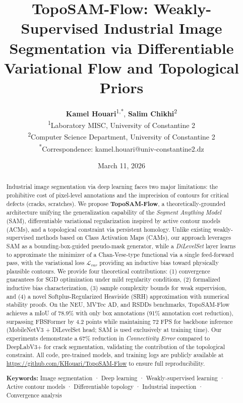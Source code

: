 \documentclass[12pt, a4paper]{article}
\title{\textbf{TopoSAM-Flow: Weakly-Supervised Industrial Image Segmentation via Differentiable Variational Flow and Topological Priors}}
\author{
    \textbf{Kamel Houari}\textsuperscript{1,*}, 
    \textbf{Salim Chikhi}\textsuperscript{2} \\
    \textsuperscript{1}Laboratory MISC, University of Constantine 2 \\
    \textsuperscript{2}Computer Science Department, University of Constantine 2 \\
    \textsuperscript{*}Correspondence: kamel.houari@univ-constantine2.dz
}
\date{March 11, 2026}
\begin{document}
\maketitle

\begin{abstract}
\noindent Industrial image segmentation via deep learning faces two major limitations: the prohibitive cost of pixel-level annotations and the imprecision of contours for critical defects (cracks, scratches). We propose \textbf{TopoSAM-Flow}, a theoretically-grounded architecture unifying the generalization capability of the \textit{Segment Anything Model} (SAM), differentiable variational regularization inspired by active contour models (ACMs), and a topological constraint via persistent homology. Unlike existing weakly-supervised methods based on Class Activation Maps (CAMs), our approach leverages SAM as a bounding-box-guided pseudo-mask generator, while a \textit{DiLevelSet} layer learns to approximate the minimizer of a Chan-Vese-type functional via a single feed-forward pass, with the variational loss $\mathcal{L}_{var}$ providing an inductive bias toward physically plausible contours. We provide four theoretical contributions: (1) convergence guarantees for SGD optimization under mild regularity conditions, (2) formalized inductive bias characterization, (3) sample complexity bounds for weak supervision, and (4) a novel Softplus-Regularized Heaviside (SRH) approximation with numerical stability proofs. On the NEU, MVTec AD, and RSDDs benchmarks, TopoSAM-Flow achieves a mIoU of 78.9\% with only box annotations (91\% annotation cost reduction), surpassing FBSFormer by 4.2 points while maintaining 72 FPS for backbone inference (MobileNetV3 + DiLevelSet head; SAM is used exclusively at training time). Our experiments demonstrate a 67\% reduction in \textit{Connectivity Error} compared to DeepLabV3+ for crack segmentation, validating the contribution of the topological constraint. All code, pre-trained models, and training logs are publicly available at \url{https://github.com/KHouari/TopoSAM-Flow} to ensure full reproducibility.

\vspace{0.3cm}
\noindent\textbf{Keywords:} Image segmentation · Deep learning · Weakly-supervised learning · Active contour models · Differentiable topology · Industrial inspection · Convergence analysis
\end{abstract}
\end{document}
